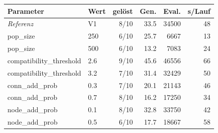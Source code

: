 \begin{tabular}{@{}llrrrr@{}}
  \toprule
  Parameter & Wert & gelöst & Gen. & Eval. & s/Lauf \\
  \midrule
  \emph{Referenz} & V1 & 8/10 & 33.5 & 34500 & 48 \\
  \midrule
  pop\_size & 250 & 6/10 & 25.7 & 6667 & 13 \\
  pop\_size & 500 & 6/10 & 13.2 & 7083 & 24 \\
  compatibility\_threshold & 2.6 & 9/10 & 45.6 & 46556 & 66 \\
  compatibility\_threshold & 3.2 & 7/10 & 31.4 & 32429 & 50 \\
  conn\_add\_prob & 0.3 & 7/10 & 20.1 & 21143 & 46 \\
  conn\_add\_prob & 0.7 & 8/10 & 16.2 & 17250 & 34 \\
  node\_add\_prob & 0.1 & 8/10 & 32.8 & 33750 & 42 \\
  node\_add\_prob & 0.5 & 6/10 & 17.7 & 18667 & 58 \\
  \bottomrule
\end{tabular}
